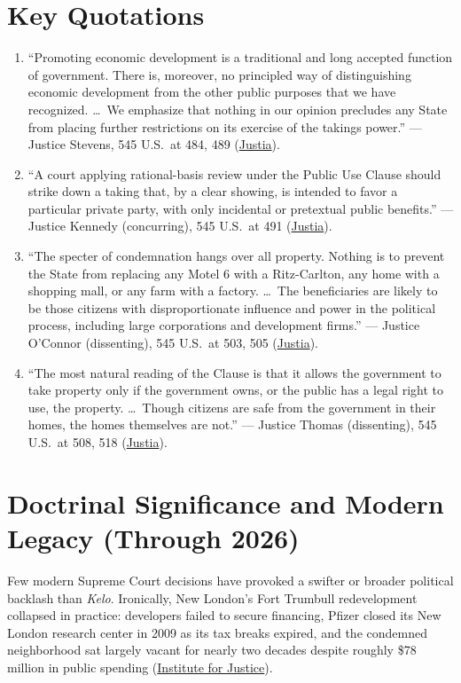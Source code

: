 \documentclass[12pt]{article}
\begin{document}
\section{Key Quotations}
\begin{enumerate}
  \item ``Promoting economic development is a traditional and long accepted function of government. There is, moreover, no principled way of distinguishing economic development from the other public purposes that we have recognized. \dots\ We emphasize that nothing in our opinion precludes any State from placing further restrictions on its exercise of the takings power.'' --- Justice Stevens, 545 U.S.\ at 484, 489 (\href{https://supreme.justia.com/cases/federal/us/545/469/}{Justia}).
  \item ``A court applying rational-basis review under the Public Use Clause should strike down a taking that, by a clear showing, is intended to favor a particular private party, with only incidental or pretextual public benefits.'' --- Justice Kennedy (concurring), 545 U.S.\ at 491 (\href{https://supreme.justia.com/cases/federal/us/545/469/}{Justia}).
  \item ``The specter of condemnation hangs over all property. Nothing is to prevent the State from replacing any Motel 6 with a Ritz-Carlton, any home with a shopping mall, or any farm with a factory. \dots\ The beneficiaries are likely to be those citizens with disproportionate influence and power in the political process, including large corporations and development firms.'' --- Justice O'Connor (dissenting), 545 U.S.\ at 503, 505 (\href{https://supreme.justia.com/cases/federal/us/545/469/}{Justia}).
  \item ``The most natural reading of the Clause is that it allows the government to take property only if the government owns, or the public has a legal right to use, the property. \dots\ Though citizens are safe from the government in their homes, the homes themselves are not.'' --- Justice Thomas (dissenting), 545 U.S.\ at 508, 518 (\href{https://supreme.justia.com/cases/federal/us/545/469/}{Justia}).
\end{enumerate}

\section{Doctrinal Significance and Modern Legacy (Through 2026)}
Few modern Supreme Court decisions have provoked a swifter or broader political backlash than \textit{Kelo}. Ironically, New London's Fort Trumbull redevelopment collapsed in practice: developers failed to secure financing, Pfizer closed its New London research center in 2009 as its tax breaks expired, and the condemned neighborhood sat largely vacant for nearly two decades despite roughly \$78 million in public spending (\href{https://ij.org/case/kelo/}{Institute for Justice}).
\end{document}
